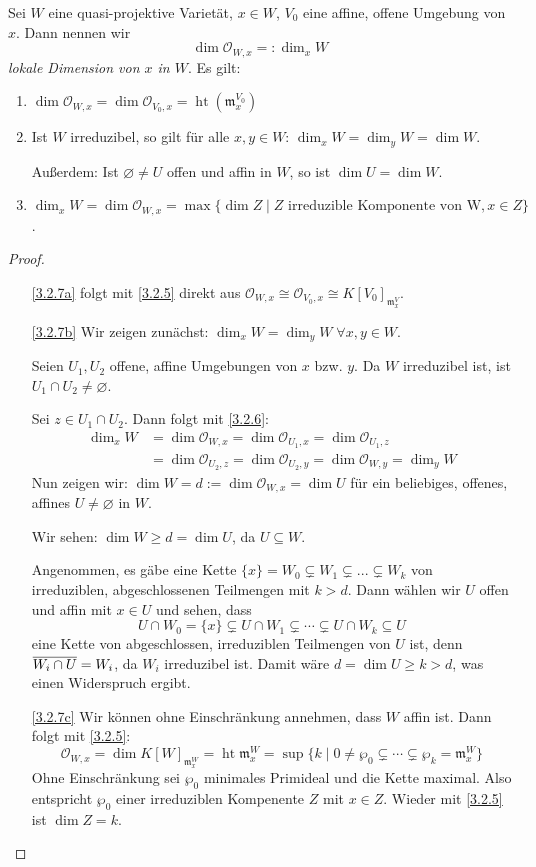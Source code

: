 \documentclass[a4paper,12pt,index=toc]{scrbook}
\theoremstyle{keinenummern} %
\def\O{\mathcal{O}}
\def\m{\mathfrak{m}}
\newcommand{\hoehe}{\operatorname{ht}}
\newcommand{\leer}{\ensuremath{\varnothing}}
\renewcommand{\dotsc}{\ensuremath{\!...}}
\def\Bar#1{\ensuremath\overline{#1}}
\begin{document}
\begin{prop}\label{3.2.7} 
Sei $W$ eine quasi-projektive Varietät, $x\in W$, $V_0$ eine affine, offene Umgebung von $x$. Dann nennen wir 
\[\dim \O_{W,x}=:\dim_x W\]
 \emph{lokale Dimension von $x$ in $W$}.
Es gilt:
  \begin{enumerate}
  \item{} $\dim \O_{W,x}=\dim \O_{V_0,x}=\hoehe(\m_x^{V_0})$
  \item{} Ist $W$ irreduzibel, so gilt für alle $x,y \in W$: $\dim_x W=\dim_y W=\dim W$.

  Außerdem: Ist $\leer \neq U$ offen und affin in $W$, so ist $\dim U=\dim W$.
  \item{} $\dim_x W=\dim \O_{W,x}=\max\{\dim Z \mid Z \text{ irreduzible Komponente von W},x\in Z\}$.
  \end{enumerate}
\end{prop}

\begin{proof}
  \begin{enumerate}
  \item[\ref{3.2.7a}] folgt mit \cref{3.2.5} direkt aus $\O_{W,x}\cong \O_{V_0,x}\cong K[V_0]_{\m_x^V}$.
  \item[\ref{3.2.7b}] Wir zeigen zunächst: $\dim_x W=\dim_y W \; \forall x,y \in W$.
  
  Seien $U_1,U_2$ offene, affine Umgebungen von $x$ bzw. $y$. Da $W$ irreduzibel ist, ist $U_1\cap U_2\neq \leer$.  

  Sei $z\in U_1\cap U_2$. Dann folgt mit \cref{3.2.6}: 
  \begin{align*}\dim_x W&=\dim \O_{W,x}=\dim \O_{U_1,x}=\dim \O_{U_1,z}\\&=\dim \O_{U_2,z}=\dim \O_{U_2,y}=\dim \O_{W,y}=\dim_y W\end{align*}
%
Nun zeigen wir: $\dim W=d:=\dim \O_{W,x}=\dim U$ für ein beliebiges, offenes, affines $U\neq \leer$ in $W$.

Wir sehen: $\dim W\ge d=\dim U$, da $U\subseteq W$. 

Angenommen, es gäbe eine Kette $\{x\}=W_0 \subsetneq W_1 \subsetneq \dotsc \subsetneq W_k$ von irreduziblen, abgeschlossenen Teilmengen mit $k>d$. Dann wählen wir $U$ offen und affin mit $x\in U$ und sehen, dass 
\[U\cap W_0=\{x\} \subsetneq U\cap W_1 \subsetneq \dotsm \subsetneq U\cap W_k\subseteq U\]
eine Kette von abgeschlossen, irreduziblen Teilmengen von $U$ ist, denn $\Bar{W_i\cap U}=W_i$, da $W_i$ irreduzibel ist. Damit wäre $d=\dim U\ge k>d$, was einen Widerspruch ergibt.
  \item[\ref{3.2.7c}] Wir können ohne Einschränkung annehmen, dass $W$ affin ist. Dann folgt mit \cref{3.2.5}:
\[\O_{W,x}=\dim K[W]_{\m_x^W}=\hoehe \m_x^W=\sup \{k \mid 0\neq \wp_0 \subsetneq \dotsm \subsetneq \wp_k=\m_x^W\}\]
Ohne Einschränkung sei $\wp_0$ minimales Primideal und die Kette maximal. Also entspricht $\wp_0$ einer irreduziblen Kompenente $Z$ mit $x\in Z$. Wieder mit \cref{3.2.5} ist $\dim Z=k$.
  \end{enumerate}
\end{proof}
\end{document}
